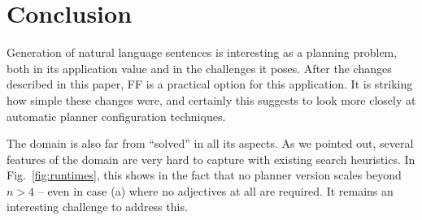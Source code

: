 
\section{Conclusion} \label{sec:conclusion}


Generation of natural language sentences is interesting as a planning
problem, both in its application value and in the challenges it
poses. After the changes described in this paper, FF is a practical
option for this application. It is striking how simple these changes
were, and certainly this suggests to look more closely at automatic
planner configuration techniques.

The domain is also far from ``solved'' in all its aspects. As we
pointed out, several features of the domain are very hard to capture
with existing search heuristics. In Fig.~\ref{fig:runtimes}, this
shows in the fact that no planner version scales beyond $n>4$ -- even
in case (a) where no adjectives at all are required. It remains an
interesting challenge to address this.






